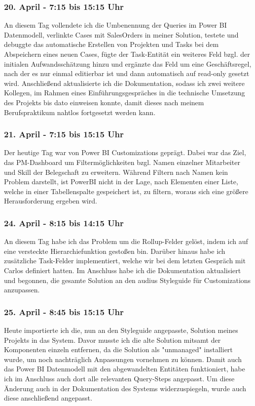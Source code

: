 \subsubsection*{20. April - 7:15 bis 15:15 Uhr}
An diesem Tag vollendete ich die Umbenennung der Queries im Power BI Datenmodell, verlinkte Cases mit SalesOrders in meiner Solution, testete und debuggte das automatische Erstellen von Projekten und Tasks bei dem Abspeichern eines neuen Cases, fügte der Task-Entität ein weiteres Feld bzgl. der initialen Aufwandsschätzung hinzu und ergänzte das Feld um eine Geschäftsregel, nach der es nur einmal editierbar ist und dann automatisch auf read-only gesetzt wird. Anschließend aktualisierte ich die Dokumentation, sodass ich zwei weitere Kollegen, im Rahmen eines Einführungsgespräches in die technische Umsetzung des Projekts bis dato einweisen konnte, damit dieses nach meinem Berufspraktikum nahtlos fortgesetzt werden kann. 

\subsubsection*{21. April - 7:15 bis 15:15 Uhr}
Der heutige Tag war von Power BI Customizations geprägt. Dabei war das Ziel, das PM-Dashboard um Filtermöglichkeiten bzgl. Namen einzelner Mitarbeiter und Skill der Belegschaft zu erweitern. Während Filtern nach Namen kein Problem darstellt, ist PowerBI nicht in der Lage, nach Elementen einer Liste, welche in einer Tabellenspalte gespeichert ist, zu filtern, woraus sich eine größere Herausforderung ergeben wird.

\subsubsection*{24. April - 8:15 bis 14:15 Uhr}
An diesem Tag habe ich das Problem um die Rollup-Felder gelöst, indem ich auf eine versteckte Hierarchiefunktion gestoßen bin. Darüber hinaus habe ich zusätzliche Task-Felder implementiert, welche wir bei dem letzten Gespräch mit Carlos definiert hatten. Im Anschluss habe ich die Dokumentation aktualisiert und begonnen, die gesamte Solution an den audius Styleguide für Customizations anzupassen.

\subsubsection*{25. April - 8:45 bis 15:15 Uhr}
Heute importierte ich die, nun an den Styleguide angepasste, Solution meines Projekts in das System. Davor musste ich die alte Solution mitsamt der Komponenten einzeln entfernen, da die Solution als "unmanaged" installiert wurde, um noch nachträglich Anpassungen vornehmen zu können. Damit auch das Power BI Datenmodell mit den abgewandelten Entitäten funktioniert, habe ich im Anschluss auch dort alle relevanten Query-Steps angepasst. Um diese Änderung auch in der Dokumentation des Systems widerzuspiegeln, wurde auch diese anschließend angepasst.


